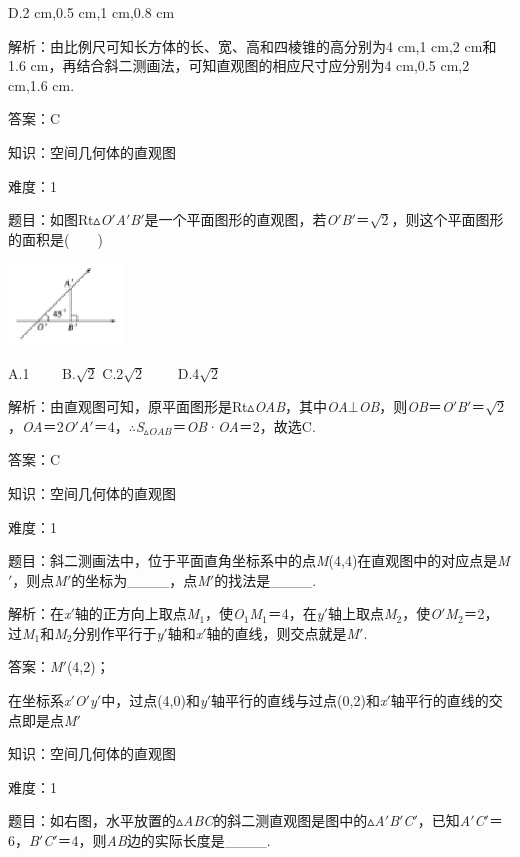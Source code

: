 \documentclass{article} %
\begin{document}
D.2 cm,0.5 cm,1 cm,0.8 cm

解析：由比例尺可知长方体的长、宽、高和四棱锥的高分别为4 cm,1 cm,2 cm和1.6 cm，再结合斜二测画法，可知直观图的相应尺寸应分别为4 cm,0.5 cm,2 cm,1.6 cm.

答案：C


知识：空间几何体的直观图

难度：1

题目：如图Rt$\mathrm{\vartriangle}$\textit{O}$'$\textit{A}$'$\textit{B}$'$是一个平面图形的直观图，若\textit{O}$'$\textit{B}$'$＝$\sqrt{2}$，则这个平面图形的面积是(　　)

\includegraphics*[width=1.21in, height=0.85in, keepaspectratio=false]{image48}

A.1　　 B.$\sqrt{2}$ C.2$\sqrt{2}$　　 D.4$\sqrt{2}$

解析：由直观图可知，原平面图形是Rt$\mathrm{\vartriangle}$\textit{OAB}，其中\textit{OA}$\mathrm{\bot}$\textit{OB}，则\textit{OB}＝\textit{O}$'$\textit{B}$'$＝$\sqrt{2}$，\textit{OA}＝2\textit{O}$'$\textit{A}$'$＝4，$\mathrm{\therefore}$\textit{S}${}_{\vartriangle }$\textit{${}_{OAB}$}＝\textit{OB}·\textit{OA}＝2，故选C.

答案：C

知识：空间几何体的直观图

难度：1

题目：斜二测画法中，位于平面直角坐标系中的点\textit{M}(4,4)在直观图中的对应点是\textit{M}$'$，则点\textit{M}$'$的坐标为\_\_\_\_，点\textit{M}$'$的找法是\_\_\_\_.

解析：在\textit{x}$'$轴的正方向上取点\textit{M}${}_{1}$，使\textit{O}${}_{1}$\textit{M}${}_{1}$＝4，在\textit{y}$'$轴上取点\textit{M}${}_{2}$，使\textit{O}$'$\textit{M}${}_{2}$＝2，过\textit{M}${}_{1}$和\textit{M}${}_{2}$分别作平行于\textit{y}$'$轴和\textit{x}$'$轴的直线，则交点就是\textit{M}$'$.

答案：\textit{M}$'$(4,2)；

在坐标系\textit{x}$'$\textit{O}$'$\textit{y}$'$中，过点(4,0)和\textit{y}$'$轴平行的直线与过点(0,2)和\textit{x}$'$轴平行的直线的交点即是点\textit{M}$'$

知识：空间几何体的直观图

难度：1

题目：如右图，水平放置的$\mathrm{\vartriangle}$\textit{ABC}的斜二测直观图是图中的$\mathrm{\vartriangle}$\textit{A}$'$\textit{B}$'$\textit{C}$'$，已知\textit{A}$'$\textit{C}$'$＝6，\textit{B}$'$\textit{C}$'$＝4，则\textit{AB}边的实际长度是\_\_\_\_.
\end{document}
